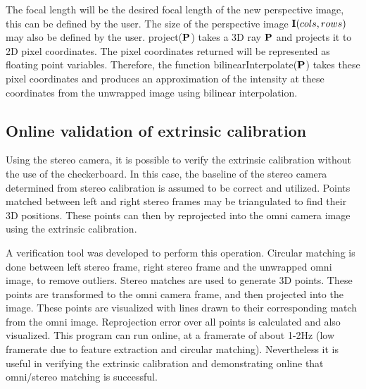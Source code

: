 The focal length will be the desired focal length of the new perspective image, this can be defined by the user.  The size of the perspective image $\mathbf I(cols, rows)$ may also be defined by the user.  project($\mathbf P$) takes a 3D ray $\mathbf P$ and projects it to 2D pixel coordinates.  The pixel coordinates returned will be represented as floating point variables.  Therefore, the function bilinearInterpolate($\mathbf P$) takes these pixel coordinates and produces an approximation of the intensity at these coordinates from the unwrapped image using bilinear interpolation.



\subsection{Online validation of extrinsic calibration}

Using the stereo camera, it is possible to verify the extrinsic calibration without the use of the checkerboard.  In this case, the baseline of the stereo camera determined from stereo calibration is assumed to be correct and utilized.  Points matched between left and right stereo frames may be triangulated to find their 3D positions.  These points can then by reprojected into the omni camera image using the extrinsic calibration.

A verification tool was developed to perform this operation.  Circular matching is done between left stereo frame, right stereo frame and the unwrapped omni image, to remove outliers.  Stereo matches are used to generate 3D points.  These points are transformed to the omni camera frame, and then projected into the image.  These points are visualized with lines drawn to their corresponding match from the omni image.  Reprojection error over all points is calculated and also visualized.  This program can run online, at a framerate of about 1-2Hz (low framerate due to feature extraction and circular matching).  Nevertheless it is useful in verifying the extrinsic calibration and demonstrating online that omni/stereo matching is successful.

